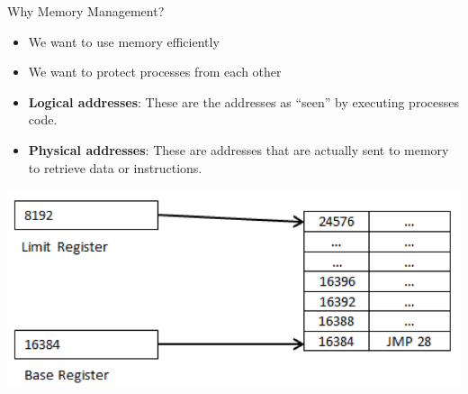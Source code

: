 \documentclass[11pt,a4paper]{article}
\theoremstyle{definition}
\newenvironment{myitemize}
{ \begin{itemize}
    \setlength{\itemsep}{5pt}
    \setlength{\parskip}{0pt}
    \setlength{\parsep}{0pt}     }
{ \end{itemize}                  }
\begin{document}
\begin{tcolorbox}
	\textsf{Why Memory Management?}
	\begin{myitemize}
		\item We want to use memory efficiently
		\item We want to protect processes from each other
	\end{myitemize}
\end{tcolorbox}

\begin{minipage}{0.4\linewidth}
	\begin{myitemize}
		\item \textbf{Logical addresses}: These are the addresses as “seen” by executing processes code.
		\item \textbf{Physical addresses}: These are addresses that are actually sent to memory to retrieve data or instructions.
	\end{myitemize}
\end{minipage}
\begin{minipage}{0.6\linewidth}
	\includegraphics[width=\linewidth]{m4/logicalAddress}
\end{minipage}
\end{document}
